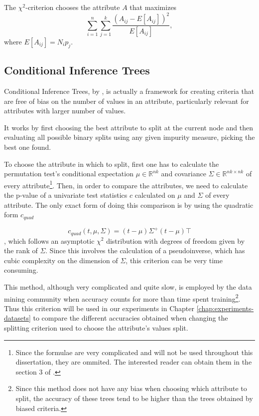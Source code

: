 The $\chi^2$-criterion chooses the attribute $A$ that maximizes
\begin{equation}
\label{eq:chitest}
\sum_{i=1}^n \sum_{j=1}^k \frac{(A_{ij}-E[A_{ij}] )^2}{E[A_{ij}]},
\end{equation}
where $E[A_{ij}]=N_i p_j$.


\subsection{Conditional Inference Trees}
Conditional Inference Trees, by \cite{Hothorn:2006:URP}, is actually a framework for creating criteria that are free of bias on the number of values in an attribute, particularly relevant for attributes with larger number of values.

It works by first choosing the best attribute to split at the current node and then evaluating all possible binary splits using any given impurity measure, picking the best one found.

To choose the attribute in which to split, first one has to calculate the permutation test's conditional expectation $\mu \in \mathbb{R}^{nk}$ and covariance $\Sigma \in \mathbb{R}^{nk\times nk}$ of every attribute\footnote{Since the formulae are very complicated and will not be used throughout this dissertation, they are ommited. The interested reader can obtain them in the section 3 of  \cite{Hothorn:2006:URP}.}. Then, in order to compare the attributes, we need to calculate the p-value of a univariate test statistics $c$ calculated on $\mu$ and $\Sigma$ of every attribute. The only exact form of doing this comparison is by using the quadratic form $c_{quad}$ 

$$c_{quad}(t, \mu, \Sigma) = (t-\mu)\Sigma^+(t-\mu)\top$$,
which follows an asymptotic $\chi^2$ distribution with degrees of freedom given by the rank of $\Sigma$. Since this involves the calculation of a pseudoinverse, which has cubic complexity on the dimension of $\Sigma$, this criterion can be very time consuming.


This method, although very complicated and quite slow, is employed by the data mining community when accuracy counts for more than time spent training\footnote{Since this method does not have any bias when choosing which attribute to split, the accuracy of these trees tend to be higher than the trees obtained by biased criteria.}. Thus this criterion will be used in our experiments in Chapter \ref{chap:experiments-datasets} to compare the different accuracies obtained when changing the splitting criterion used to choose the attribute's values split.


